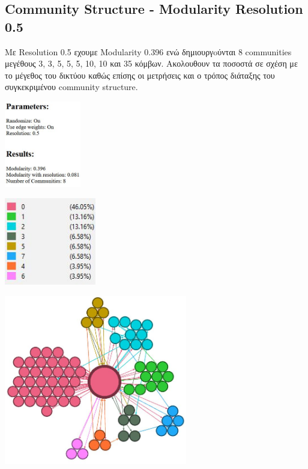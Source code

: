 \documentclass[12pt]{article}
\begin{document}
		
	\newpage
	\subsection{Community Structure - Modularity Resolution 0.5}
	Με Resolution 0.5 εχουμε Modularity 0.396 ενώ δημιουργoύνται 8 communities μεγέθους 3, 3, 5, 5, 5, 10, 10 και 35 κόμβων. Ακολουθουν τα ποσοστά σε σχέση με το μέγεθος του δικτύου καθώς επίσης οι μετρήσεις και ο τρόπος διάταξης του συγκεκριμένου community structure.
	
	\vspace{12pt}
	\vspace{12pt}
	\begin{center}
		\begin{adjustbox}{valign=t}
			\includegraphics[width=0.25\textwidth]{photos-files/section12/0.5/report.JPG}
		\end{adjustbox}
		\hfill
		\begin{adjustbox}{valign=t}
			\includegraphics[width=0.3\textwidth]{photos-files/section12/0.5/pososta.JPG}
		\end{adjustbox}
	\end{center}
	
	\vspace{12pt}
	\vspace{12pt}
	\begin{center}
		\includegraphics[width=0.6\textwidth]{photos-files/section12/0.5/no_label_layout.JPG}
	\end{center}
	
\end{document}
